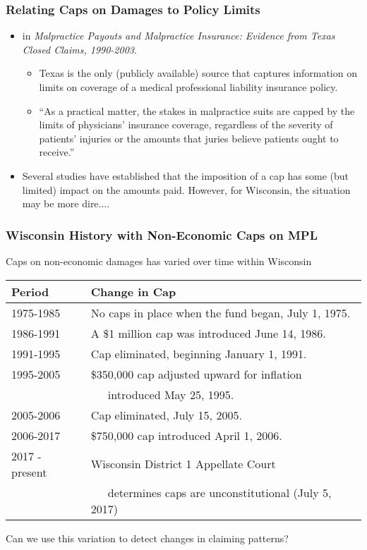 \documentclass[serif,10pt]{beamer}
\begin{document}
\begin{frame}
\frametitle{Relating Caps on Damages to Policy Limits}

  \begin{itemize}
\item \cite{silver2008malpractice} in {\small \textit{Malpractice Payouts and Malpractice Insurance: Evidence from Texas Closed Claims, 1990-2003}}.
  \begin{itemize}
\item  Texas is the only (publicly available) source that captures information on limits on coverage of a medical professional liability insurance policy.
\item  ``As a practical matter, the stakes in malpractice suits are capped by the limits of physicians' insurance coverage, regardless of the severity of patients' injuries or the amounts that juries believe patients ought to receive.''\end{itemize}
\item Several studies have established that the imposition of a cap has some (but limited)  impact on the amounts paid. However, for Wisconsin, the situation may be more dire....
\end{itemize}
\end{frame}


\begin{frame}
\frametitle{Wisconsin History with Non-Economic Caps on MPL}
Caps on non-economic damages has varied over time within Wisconsin

\begin{table}
    \begin{tabular}{l|l}
    \hline
\textbf{Period} & \textbf{Change in Cap}\\    \hline
1975-1985& No caps in place when the fund began, July 1, 1975. \\ \hline
1986-1991& A \$1 million cap was introduced June 14, 1986.\\
1991-1995& Cap eliminated, beginning January 1, 1991.\\ \hline
1995-2005& \$350,000 cap adjusted upward for inflation \\
&~~~introduced May 25, 1995.\\
2005-2006& Cap eliminated, July 15, 2005.\\ \hline
2006-2017& \$750,000 cap introduced April 1, 2006.\\
2017 - present& Wisconsin District 1 Appellate Court \\
&~~~determines caps are unconstitutional (July 5, 2017)\\
    \hline
    \end{tabular}
\end{table}

Can we use this variation to detect changes in claiming patterns?
\end{frame}
\end{document}
